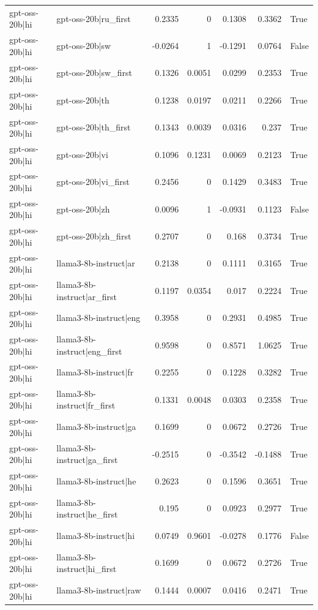 \begin{table}
\begin{tabular}{l l r r r r l}
gpt-oss-20b|hi & gpt-oss-20b|ru_first & 0.2335 & 0 & 0.1308 & 0.3362 & True \\
gpt-oss-20b|hi & gpt-oss-20b|sw & -0.0264 & 1 & -0.1291 & 0.0764 & False \\
gpt-oss-20b|hi & gpt-oss-20b|sw_first & 0.1326 & 0.0051 & 0.0299 & 0.2353 & True \\
gpt-oss-20b|hi & gpt-oss-20b|th & 0.1238 & 0.0197 & 0.0211 & 0.2266 & True \\
gpt-oss-20b|hi & gpt-oss-20b|th_first & 0.1343 & 0.0039 & 0.0316 & 0.237 & True \\
gpt-oss-20b|hi & gpt-oss-20b|vi & 0.1096 & 0.1231 & 0.0069 & 0.2123 & True \\
gpt-oss-20b|hi & gpt-oss-20b|vi_first & 0.2456 & 0 & 0.1429 & 0.3483 & True \\
gpt-oss-20b|hi & gpt-oss-20b|zh & 0.0096 & 1 & -0.0931 & 0.1123 & False \\
gpt-oss-20b|hi & gpt-oss-20b|zh_first & 0.2707 & 0 & 0.168 & 0.3734 & True \\
gpt-oss-20b|hi & llama3-8b-instruct|ar & 0.2138 & 0 & 0.1111 & 0.3165 & True \\
gpt-oss-20b|hi & llama3-8b-instruct|ar_first & 0.1197 & 0.0354 & 0.017 & 0.2224 & True \\
gpt-oss-20b|hi & llama3-8b-instruct|eng & 0.3958 & 0 & 0.2931 & 0.4985 & True \\
gpt-oss-20b|hi & llama3-8b-instruct|eng_first & 0.9598 & 0 & 0.8571 & 1.0625 & True \\
gpt-oss-20b|hi & llama3-8b-instruct|fr & 0.2255 & 0 & 0.1228 & 0.3282 & True \\
gpt-oss-20b|hi & llama3-8b-instruct|fr_first & 0.1331 & 0.0048 & 0.0303 & 0.2358 & True \\
gpt-oss-20b|hi & llama3-8b-instruct|ga & 0.1699 & 0 & 0.0672 & 0.2726 & True \\
gpt-oss-20b|hi & llama3-8b-instruct|ga_first & -0.2515 & 0 & -0.3542 & -0.1488 & True \\
gpt-oss-20b|hi & llama3-8b-instruct|he & 0.2623 & 0 & 0.1596 & 0.3651 & True \\
gpt-oss-20b|hi & llama3-8b-instruct|he_first & 0.195 & 0 & 0.0923 & 0.2977 & True \\
gpt-oss-20b|hi & llama3-8b-instruct|hi & 0.0749 & 0.9601 & -0.0278 & 0.1776 & False \\
gpt-oss-20b|hi & llama3-8b-instruct|hi_first & 0.1699 & 0 & 0.0672 & 0.2726 & True \\
gpt-oss-20b|hi & llama3-8b-instruct|raw & 0.1444 & 0.0007 & 0.0416 & 0.2471 & True \\

\end{tabular}
\end{table}
